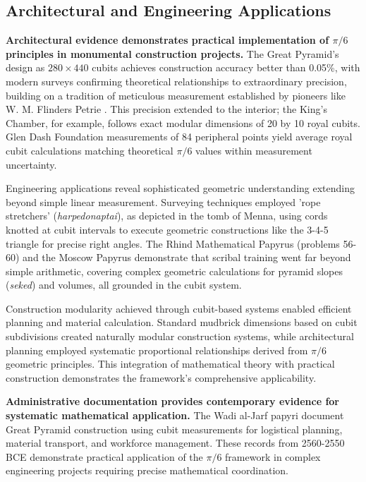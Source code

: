 \documentclass[11pt]{article}
\begin{document}
\subsection{Architectural and Engineering Applications}

\textbf{Architectural evidence demonstrates practical implementation of $\pi/6$ principles in monumental construction projects.} The Great Pyramid's design as $280 \times 440$ cubits achieves construction accuracy better than 0.05\%, with modern surveys confirming theoretical relationships to extraordinary precision, building on a tradition of meticulous measurement established by pioneers like W. M. Flinders Petrie \cite{petrie1883pyramids}. This precision extended to the interior; the King's Chamber, for example, follows exact modular dimensions of 20 by 10 royal cubits. Glen Dash Foundation measurements of 84 peripheral points yield average royal cubit calculations matching theoretical $\pi/6$ values within measurement uncertainty.

Engineering applications reveal sophisticated geometric understanding extending beyond simple linear measurement. Surveying techniques employed 'rope stretchers' (\textit{harpedonaptai}), as depicted in the tomb of Menna, using cords knotted at cubit intervals to execute geometric constructions like the 3-4-5 triangle for precise right angles. The Rhind Mathematical Papyrus (problems 56-60) and the Moscow Papyrus demonstrate that scribal training went far beyond simple arithmetic, covering complex geometric calculations for pyramid slopes (\textit{seked}) and volumes, all grounded in the cubit system.

Construction modularity achieved through cubit-based systems enabled efficient planning and material calculation. Standard mudbrick dimensions based on cubit subdivisions created naturally modular construction systems, while architectural planning employed systematic proportional relationships derived from $\pi/6$ geometric principles. This integration of mathematical theory with practical construction demonstrates the framework's comprehensive applicability.

\textbf{Administrative documentation provides contemporary evidence for systematic mathematical application.} The Wadi al-Jarf papyri document Great Pyramid construction using cubit measurements for logistical planning, material transport, and workforce management. These records from 2560-2550 BCE demonstrate practical application of the $\pi/6$ framework in complex engineering projects requiring precise mathematical coordination.
\end{document}
